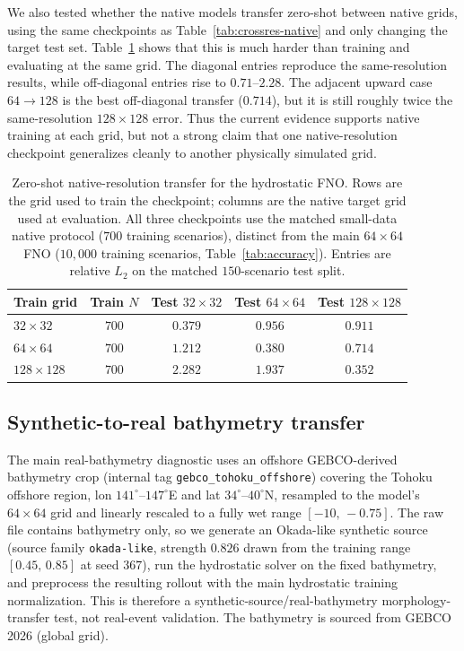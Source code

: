 We also tested whether the native models transfer zero-shot between native grids, using the same checkpoints as Table~\ref{tab:crossres-native} and only changing the target test set. Table~\ref{tab:crossres-native-transfer} shows that this is much harder than training and evaluating at the same grid. The diagonal entries reproduce the same-resolution results, while off-diagonal entries rise to $0.71$--$2.28$. The adjacent upward case $64 \rightarrow 128$ is the best off-diagonal transfer ($0.714$), but it is still roughly twice the same-resolution $128 \times 128$ error. Thus the current evidence supports native training at each grid, but not a strong claim that one native-resolution checkpoint generalizes cleanly to another physically simulated grid.

\begin{table}[H]
\centering
\caption{Zero-shot native-resolution transfer for the hydrostatic FNO. Rows are the grid used to train the checkpoint; columns are the native target grid used at evaluation. All three checkpoints use the matched small-data native protocol ($700$ training scenarios), distinct from the main $64 \times 64$ FNO ($10{,}000$ training scenarios, Table~\ref{tab:accuracy}). Entries are relative $L_2$ on the matched $150$-scenario test split.}
\label{tab:crossres-native-transfer}
\begin{tabular}{lcccc}
    \toprule
    Train grid & Train $N$ & Test $32 \times 32$ & Test $64 \times 64$ & Test $128 \times 128$ \\
    \midrule
    $32 \times 32$   & $700$ & $0.379$ & $0.956$ & $0.911$ \\
    $64 \times 64$   & $700$ & $1.212$ & $0.380$ & $0.714$ \\
    $128 \times 128$ & $700$ & $2.282$ & $1.937$ & $0.352$ \\
    \bottomrule
\end{tabular}
\end{table}

\subsection{Synthetic-to-real bathymetry transfer}
\label{subsec:res-real}
The main real-bathymetry diagnostic uses an offshore GEBCO-derived bathymetry crop (internal tag \texttt{gebco\_tohoku\_offshore}) covering the Tohoku offshore region, lon $141^\circ$--$147^\circ$E and lat $34^\circ$--$40^\circ$N, resampled to the model's $64\times64$ grid and linearly rescaled to a fully wet range $[-10,\,-0.75]$. The raw file contains bathymetry only, so we generate an Okada-like synthetic source (source family \texttt{okada-like}, strength $0.826$ drawn from the training range $[0.45,\,0.85]$ at seed $367$), run the hydrostatic solver on the fixed bathymetry, and preprocess the resulting rollout with the main hydrostatic training normalization. This is therefore a synthetic-source/real-bathymetry morphology-transfer test, not real-event validation. The bathymetry is sourced from GEBCO 2026 (global grid).

